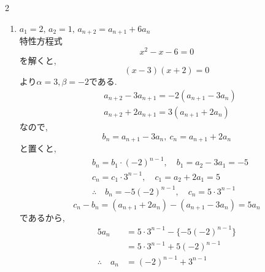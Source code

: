 \documentclass[dvipdfmx,a4paper,11pt,fleqn,openany]{jsbook}
\begin{document}
\begin{multicols*}{2}
\begin{enumerate}[label=(\arabic*),parsep=3pt]
\[                b_n=2\cdot2^{n-1}=2^n
              \]
              したがって
              \[
                a_{n+1}-2a_n=2^n
              \]
              である.両辺を$2^{n+1}$で割ると,
              \[
                \frac{a_{n+1}}{2^{n+1}}-\frac{a_n}{2^n}=\frac12
              \]
              ここで
              \[
                c_n=\dfrac{a_n}{2^n}
              \]
              と置くと,
              \begin{align*}
                &c_{n+1}=c_n+\frac12,\quad c_1=\frac{a_1}{2}=\frac12\\
                &\therefore \quad c_n=\frac12+(n-1)\cdot\frac12=\frac n2\\
                &\therefore \quad a_n=2^n\cdot c_n=n\cdot2^{n-1}
              \end{align*}
        \item $\displaystyle a_1=2,\,a_2=1,\, a_{n+2}=a_{n+1}+6a_n$\\
              特性方程式
              \[
                x^2-x-6=0
              \]
              を解くと,
              \[
                (x-3)(x+2)=0
              \]
              より$\alpha=3,\beta=-2$である.
              \begin{align*}
                &a_{n+2}-3a_{n+1}=-2(a_{n+1}-3a_n)\\
                &a_{n+2}+2a_{n+1}=3(a_{n+1}+2a_n)
              \end{align*}
              なので,
              \[
                b_n=a_{n+1}-3a_n,\ c_n=a_{n+1}+2a_n
              \]
              と置くと,
              \begin{align*}
                &b_n=b_1\cdot(-2)^{n-1},\quad b_1=a_2-3a_1=-5\\
                &c_n=c_1\cdot3^{n-1},\quad c_1=a_2+2a_1=5\\
                &\therefore \quad b_n=-5(-2)^{n-1},\quad c_n=5\cdot3^{n-1}
              \end{align*}
              \[
                c_n-b_n=(a_{n+1}+2a_n)-(a_{n+1}-3a_n)=5a_n
              \]
              であるから,
              \begin{align*}
                5a_n&=5\cdot3^{n-1}-\{-5(-2)^{n-1}\}\\
                &=5\cdot3^{n-1}+5(-2)^{n-1}\\
                \therefore\quad a_n&=(-2)^{n-1}+3^{n-1}
              \end{align*}
      \end{enumerate}


\end{multicols*}
\end{document}
